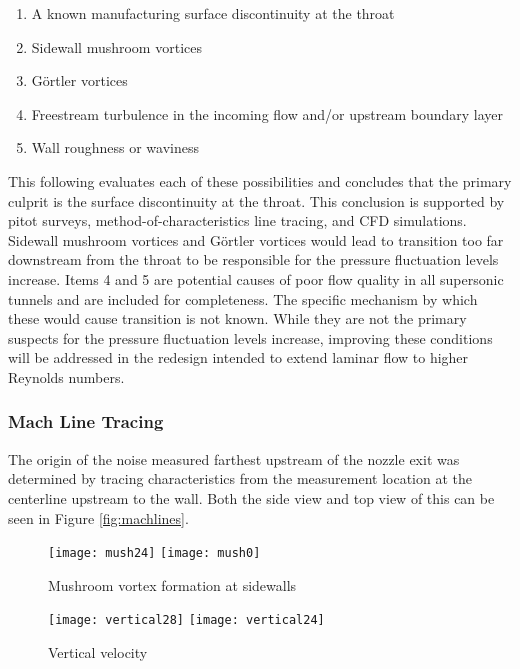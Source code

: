\begin{enumerate}
    \item A known manufacturing surface discontinuity at the throat
    \item Sidewall mushroom vortices
    \item Görtler vortices
    \item Freestream turbulence in the incoming flow and/or upstream boundary layer
    \item Wall roughness or waviness
\end{enumerate}

This following evaluates each of these possibilities and concludes that the primary culprit is the surface discontinuity at the throat. This conclusion is supported by pitot surveys, method-of-characteristics line tracing, and CFD simulations. Sidewall mushroom vortices and Görtler vortices would lead to transition too far downstream from the throat to be responsible for the pressure fluctuation levels increase. Items 4 and 5 are potential causes of poor flow quality in all supersonic tunnels and are included for completeness. The specific mechanism by which these would cause transition is not known. While they are not the primary suspects for the pressure fluctuation levels increase, improving these conditions will be addressed in the redesign intended to extend laminar flow to higher Reynolds numbers.

\subsubsection*{Mach Line Tracing}

The origin of the noise measured farthest upstream of the nozzle exit was determined by tracing characteristics from the measurement location at the centerline upstream to the wall. Both the side view and top view of this can be seen in Figure \ref{fig:machlines}.

\begin{figure}[ht]
    \centering
    \texttt{[image: mush24]}
    \texttt{[image: mush0]}
    \caption{Mushroom vortex formation at sidewalls}
    \label{fig:mushrooms}
\end{figure}

\begin{figure}[ht]
    \centering
    \texttt{[image: vertical28]}
    \texttt{[image: vertical24]}
    \caption{Vertical velocity}
    \label{fig:vertical-vel}
\end{figure}


